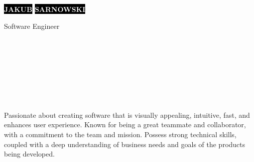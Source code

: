 \documentclass[9pt]{config}
\begin{document}

\begin{minipage}[t]{0.45\textwidth}
  \vspace{-\baselineskip}

  \colorbox{black}{{\HUGE\textcolor{white}{\textbf{\MakeUppercase{Jakub}}}}}
  \colorbox{black}{{\HUGE\textcolor{white}{\textbf{\MakeUppercase{Sarnowski}}}}}

  \vspace{6pt}

  {\huge Software Engineer}
\end{minipage}
\hfill
\begin{minipage}[t]{0.27\textwidth}
  \vspace{-\baselineskip}

  \\
  \\
  \\
\end{minipage}
\hfill
\begin{minipage}[t]{0.27\textwidth}
  \vspace{-\baselineskip}

  \\
  \\
  \\
\end{minipage}



\begin{minipage}[t]{1\textwidth}
  \vspace{-\baselineskip}

  Passionate about creating software that is visually appealing, intuitive, fast, and enhances user experience. Known for being a great teammate and collaborator, with a commitment to the team and mission. Possess strong technical skills, coupled with a deep understanding of business needs and goals of the products being developed.
\end{minipage}
\hfill
\end{document}
